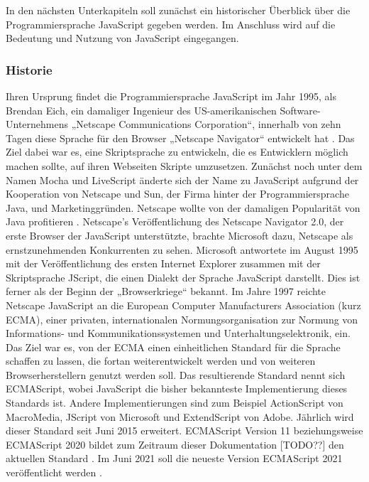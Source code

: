 In den nächsten Unterkapiteln soll zunächst ein historischer Überblick über die Programmiersprache JavaScript gegeben werden. Im Anschluss wird auf die Bedeutung und Nutzung von JavaScript eingegangen. 
\newline

\subsubsection{Historie}
Ihren Ursprung findet die Programmiersprache JavaScript im Jahr 1995, als Brendan Eich, ein damaliger Ingenieur des US-amerikanischen Software-Unternehmens „Netscape Communications Corporation“, innerhalb von zehn Tagen diese Sprache für den Browser „Netscape Navigator“ entwickelt hat \cite{JS1}. Das Ziel dabei war es, eine Skriptsprache zu entwickeln, die es Entwicklern möglich machen sollte, auf ihren Webseiten Skripte umzusetzen. Zunächst noch unter dem Namen Mocha und LiveScript änderte sich der Name zu JavaScript aufgrund der Kooperation von Netscape und Sun, der Firma hinter der Programmiersprache Java, und Marketinggründen. Netscape wollte von der damaligen Popularität von Java profitieren \cite{JS1.05}. 
\newline
\noindent
Netscape’s Veröffentlichung des Netscape Navigator 2.0, der erste Browser der JavaScript unterstützte, brachte Microsoft dazu, Netscape als ernstzunehmenden Konkurrenten zu sehen. 
Microsoft antwortete im August 1995 mit der Veröffentlichung des ersten Internet Explorer zusammen mit der Skriptsprache JScript, die einen Dialekt der Sprache JavaScript darstellt. Dies ist ferner als der Beginn der „Browserkriege“ bekannt\cite{JS1.06}.
\newline
\noindent
Im Jahre 1997 reichte Netscape JavaScript an die European Computer Manufacturers Association (kurz ECMA), einer privaten, internationalen Normungsorganisation zur Normung von Informations- und Kommunikationssystemen und Unterhaltungselektronik, ein. Das Ziel war es, von der ECMA einen einheitlichen Standard für die Sprache schaffen zu lassen, die fortan weiterentwickelt werden und von weiteren Browserherstellern genutzt werden soll. Das resultierende Standard nennt sich ECMAScript, wobei JavaScript die bisher bekannteste Implementierung dieses Standards ist\cite{JS1.07}. 
Andere Implementierungen sind zum Beispiel ActionScript von Macro\-Media, JScript von Microsoft und ExtendScript von Adobe.
\newline
\noindent
Jährlich wird dieser Standard seit Juni 2015 erweitert. ECMAScript Version 11 beziehungs\-weise ECMAScript 2020 bildet zum Zeitraum dieser Dokumentation [TODO??] den aktuellen Standard \cite{JS1.08}. 
Im Juni 2021 soll die neueste Version ECMAScript 2021 veröffentlicht werden \cite{JS1.09}. 
\newline

